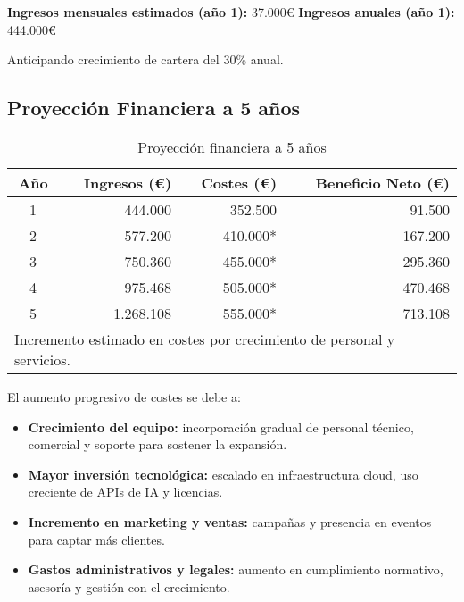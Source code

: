 \textbf{Ingresos mensuales estimados (año 1):} 37.000€  
\textbf{Ingresos anuales (año 1):} 444.000€

Anticipando crecimiento de cartera del 30\% anual.

\subsection{Proyección Financiera a 5 años}

\begin{table}[H]
\centering
\begin{tabular}{|c|r|r|r|}
\hline
\textbf{Año} & \textbf{Ingresos (€)} & \textbf{Costes (€)} & \textbf{Beneficio Neto (€)} \\
\hline
1 & 444.000 & 352.500 & 91.500 \\
2 & 577.200 & 410.000* & 167.200 \\
3 & 750.360 & 455.000* & 295.360 \\
4 & 975.468 & 505.000* & 470.468 \\
5 & 1.268.108 & 555.000* & 713.108 \\
\hline
\multicolumn{4}{l}{\footnotesize *Incremento estimado en costes por crecimiento de personal y servicios.}
\end{tabular}
\caption{Proyección financiera a 5 años}
\end{table}

El aumento progresivo de costes se debe a:

\begin{itemize}
  \item \textbf{Crecimiento del equipo:} incorporación gradual de personal técnico, comercial y soporte para sostener la expansión.
  \item \textbf{Mayor inversión tecnológica:} escalado en infraestructura cloud, uso creciente de APIs de IA y licencias.
  \item \textbf{Incremento en marketing y ventas:} campañas y presencia en eventos para captar más clientes.
  \item \textbf{Gastos administrativos y legales:} aumento en cumplimiento normativo, asesoría y gestión con el crecimiento.
\end{itemize}
